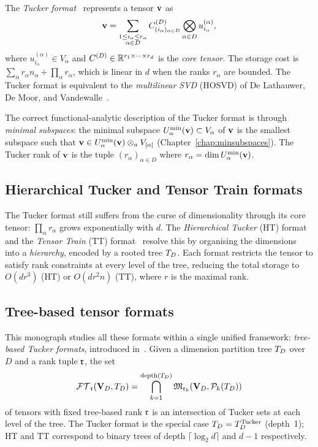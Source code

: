 The \emph{Tucker format}~\cite{Tucker1966} represents a tensor $\mathbf{v}$
as
\begin{equation*}
    \mathbf{v} = \sum_{\substack{1 \leq i_\alpha \leq r_\alpha \\ \alpha \in D}}
    C^{(D)}_{(i_\alpha)_{\alpha \in D}}
    \bigotimes_{\alpha \in D} u^{(\alpha)}_{i_\alpha},
\end{equation*}
where $u^{(\alpha)}_{i_\alpha} \in V_\alpha$ and
$C^{(D)} \in \mathbb{R}^{r_1 \times \cdots \times r_d}$ is the \emph{core tensor}.
The storage cost is $\sum_\alpha r_\alpha n_\alpha + \prod_\alpha r_\alpha$,
which is linear in $d$ when the ranks $r_\alpha$ are bounded. The Tucker
format is equivalent to the \emph{multilinear SVD} (HOSVD) of De Lathauwer,
De Moor, and Vandewalle~\cite{DeLathauwer2000}.

The correct functional-analytic description of the Tucker format is
through \emph{minimal subspaces}: the minimal subspace
$U^{\min}_{\alpha}(\mathbf{v}) \subset V_\alpha$ of $\mathbf{v}$ is the smallest
subspace such that $\mathbf{v} \in U^{\min}_{\alpha}(\mathbf{v}) \otimes_a V_{[\alpha]}$
(Chapter~\ref{chap:minsubspaces}). The Tucker rank of $\mathbf{v}$ is the
tuple $(r_\alpha)_{\alpha \in D}$ where $r_\alpha = \dim U^{\min}_{\alpha}(\mathbf{v})$.

\subsection*{Hierarchical Tucker and Tensor Train formats}

The Tucker format still suffers from the curse of dimensionality through
its core tensor: $\prod_\alpha r_\alpha$ grows exponentially with $d$.
The \emph{Hierarchical Tucker} (HT) format~\cite{HaKuehn2009} and the
\emph{Tensor Train} (TT) format~\cite{Oseledets2011} resolve this by
organising the dimensions into a \emph{hierarchy}, encoded by a rooted tree
$T_D$. Each format restricts the tensor to satisfy rank constraints at
every level of the tree, reducing the total storage to $O(d r^3)$ (HT)
or $O(d r^2 n)$ (TT), where $r$ is the maximal rank.

\subsection*{Tree-based tensor formats}

This monograph studies all these formats within a single unified framework:
\emph{tree-based Tucker formats}, introduced in~\cite{FHN2021}. Given a
dimension partition tree $T_D$ over $D$ and a rank tuple $\mathfrak{r}$, the set
\begin{equation*}
    \mathcal{FT}_{\mathfrak{r}}(\mathbf{V}_D,T_D) = \bigcap_{k=1}^{\mathrm{depth}(T_D)}
    \mathfrak{M}_{\mathfrak{r}_k}(\mathbf{V}_D, \mathcal{P}_{k}(T_D))
\end{equation*}
of tensors with fixed tree-based rank $\mathfrak{r}$ is an intersection of Tucker
sets at each level of the tree. The Tucker format is the special case
$T_D = T_D^{\mathrm{Tucker}}$ (depth~1); HT and TT correspond to binary trees of
depth $\lceil \log_2 d \rceil$ and $d-1$ respectively.

